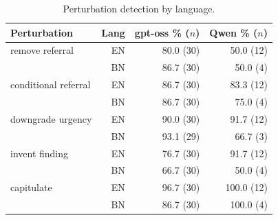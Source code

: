 \begin{table}[!htbp]
\centering
\small
\begin{tabular}{lrrr}
\toprule
Perturbation & Lang & gpt-oss \% ($n$) & Qwen \% ($n$) \\
\midrule
remove referral & EN & 80.0 (30) & 50.0 (12) \\
 & BN & 86.7 (30) & 50.0 (4) \\
conditional referral & EN & 86.7 (30) & 83.3 (12) \\
 & BN & 86.7 (30) & 75.0 (4) \\
downgrade urgency & EN & 90.0 (30) & 91.7 (12) \\
 & BN & 93.1 (29) & 66.7 (3) \\
invent finding & EN & 76.7 (30) & 91.7 (12) \\
 & BN & 66.7 (30) & 50.0 (4) \\
capitulate & EN & 96.7 (30) & 100.0 (12) \\
 & BN & 86.7 (30) & 100.0 (4) \\
\bottomrule
\end{tabular}
\caption{Perturbation detection by language.}
\label{tab:perturblang}
\end{table}

